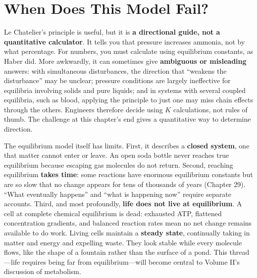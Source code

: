 \section{When Does This Model Fail?}

Le Chatelier's principle is useful, but it is \textbf{a directional guide, not a quantitative calculator}. It tells you that pressure increases ammonia, not by what percentage. For numbers, you must calculate using equilibrium constants, as Haber did. More awkwardly, it can sometimes give \textbf{ambiguous or misleading} answers: with simultaneous disturbances, the direction that ``weakens the disturbance'' may be unclear; pressure conditions are largely ineffective for equilibria involving solids and pure liquids; and in systems with several coupled equilibria, such as blood, applying the principle to just one may miss chain effects through the others. Engineers therefore decide using $K$ calculations, not rules of thumb. The challenge at this chapter's end gives a quantitative way to determine direction.

The equilibrium model itself has limits. First, it describes a \textbf{closed system}, one that matter cannot enter or leave. An open soda bottle never reaches true equilibrium because escaping gas molecules do not return. Second, reaching equilibrium \textbf{takes time}: some reactions have enormous equilibrium constants but are so slow that no change appears for tens of thousands of years (Chapter 29). ``What eventually happens'' and ``what is happening now'' require separate accounts. Third, and most profoundly, \textbf{life does not live at equilibrium}. A cell at complete chemical equilibrium is dead: exhausted ATP, flattened concentration gradients, and balanced reaction rates mean no net change remains available to do work. Living cells maintain a \textbf{steady state}, continually taking in matter and energy and expelling waste. They look stable while every molecule flows, like the shape of a fountain rather than the surface of a pond. This thread---life requires being far from equilibrium---will become central to Volume II's discussion of metabolism.


